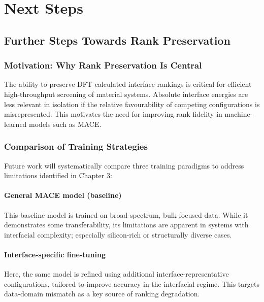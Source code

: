 \chapter{Next Steps} \label{chapter:next_steps}

\section{Further Steps Towards Rank Preservation} \label{section:rank_preservation}

\subsection{Motivation: Why Rank Preservation Is Central}

The ability to preserve DFT-calculated interface rankings is critical for efficient high-throughput screening of material systems. Absolute interface energies are less relevant in isolation if the relative favourability of competing configurations is misrepresented. This motivates the need for improving rank fidelity in machine-learned models such as MACE.

\subsection{Comparison of Training Strategies}

Future work will systematically compare three training paradigms to address limitations identified in Chapter 3:

\subsubsection{General MACE model (baseline)}

This baseline model is trained on broad-spectrum, bulk-focused data. While it demonstrates some transferability, its limitations are apparent in systems with interfacial complexity; especially silicon-rich or structurally diverse cases.

\subsubsection{Interface-specific fine-tuning}

Here, the same model is refined using additional interface-representative configurations, tailored to improve accuracy in the interfacial regime. This targets data-domain mismatch as a key source of ranking degradation.

